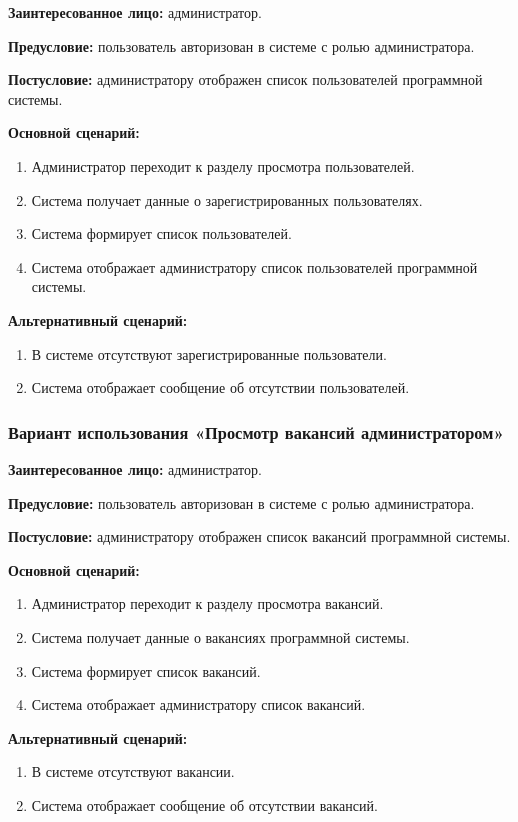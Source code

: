 \textbf{Заинтересованное лицо:} администратор.

\textbf{Предусловие:} пользователь авторизован в системе с ролью администратора.

\textbf{Постусловие:} администратору отображен список пользователей программной системы.

\textbf{Основной сценарий:}
\begin{enumerate}
	\item Администратор переходит к разделу просмотра пользователей.
	\item Система получает данные о зарегистрированных пользователях.
	\item Система формирует список пользователей.
	\item Система отображает администратору список пользователей программной системы.
\end{enumerate}

\textbf{Альтернативный сценарий:}
\begin{enumerate}
	\item В системе отсутствуют зарегистрированные пользователи.
	\item Система отображает сообщение об отсутствии пользователей.
\end{enumerate}

\subsubsection{Вариант использования «Просмотр вакансий администратором»}

\textbf{Заинтересованное лицо:} администратор.

\textbf{Предусловие:} пользователь авторизован в системе с ролью администратора.

\textbf{Постусловие:} администратору отображен список вакансий программной системы.

\textbf{Основной сценарий:}
\begin{enumerate}
	\item Администратор переходит к разделу просмотра вакансий.
	\item Система получает данные о вакансиях программной системы.
	\item Система формирует список вакансий.
	\item Система отображает администратору список вакансий.
\end{enumerate}

\textbf{Альтернативный сценарий:}
\begin{enumerate}
	\item В системе отсутствуют вакансии.
	\item Система отображает сообщение об отсутствии вакансий.
\end{enumerate}

